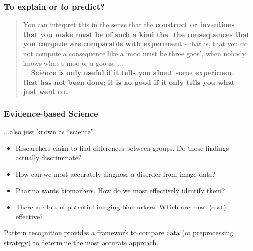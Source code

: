 \begin{frame}
\frametitle{To explain or to predict?}

\begin{quote}
You can interpret this in the sense that the {\bf construct or inventions that you make must be of such a kind that the consequences that you compute are comparable with experiment} - that is, that you do not compute a consequence like a `moo must be three goos', when nobody knows what a moo or a goo is.
...\\
....{\bf Science is only useful if it tells you about some experiment that has not been done; it is no good if it only tells you what just went on.}
\par {}
\end{quote}
\end{frame}



\begin{frame}
\frametitle{Evidence-based Science}
...also just known as ``science''.
\vspace{0.5cm}
\begin{itemize}
\item{Researchers claim to find differences between groups.  Do those findings actually discriminate?}
\item{How can we most accurately diagnose a disorder from image data?}
\item{Pharma wants biomarkers.  How do we most effectively identify them?}
\item{There are lots of potential imaging biomarkers.  Which are most (cost) effective?}
\end{itemize}

Pattern recognition provides a framework to compare data (or preprocessing strategy) to determine the most accurate approach.
\end{frame}

